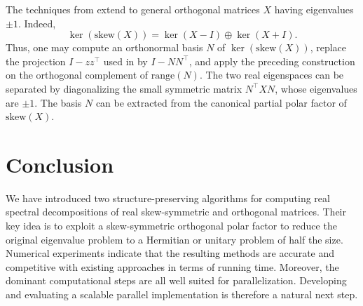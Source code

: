 \documentclass[final,onefignum,onetabnum,dvipsnames]{siamart251216}
\numberwithin{algorithm}{section}
\numberwithin{equation}{section}
\begin{document}

\begin{remark}[Eigenvalues $\pm1$]
The techniques from  extend to general orthogonal matrices $X$ having
eigenvalues $\pm1$. Indeed,
\[
    \ker(\mathrm{skew}(X))
    =
    \ker(X-I)\oplus\ker(X+I).
\]
Thus, one may compute an orthonormal basis $N$ of
$\ker(\mathrm{skew}(X))$, replace the projection $I-zz^\top$ used in
 by $I-NN^\top$, and apply the preceding construction
on the orthogonal complement of $\mathrm{range}(N)$. The two real
eigenspaces can be separated by diagonalizing the small symmetric
matrix $N^\top XN$, whose eigenvalues are $\pm1$. 
The basis $N$ can be extracted from the canonical partial polar factor of $\mathrm{skew}(X)$.
\end{remark}

\section{Conclusion}

We have introduced two structure-preserving algorithms for computing real
spectral decompositions of real skew-symmetric and orthogonal matrices.
Their key idea is to exploit a skew-symmetric orthogonal polar factor to
reduce the original eigenvalue problem to a Hermitian or unitary problem
of half the size. Numerical experiments indicate that the resulting
methods are accurate and competitive with existing approaches in terms of
running time. Moreover, the dominant computational steps are all well suited 
for parallelization. Developing and evaluating a scalable parallel implementation is
therefore a natural next step.
\end{document}
